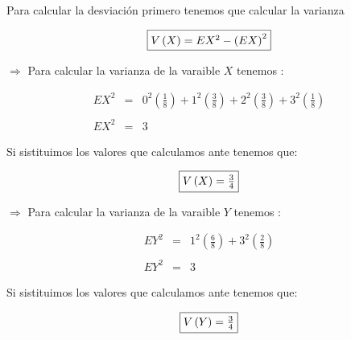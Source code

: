 \documentclass[12pt]{article}
\begin{document}
\begin{flushleft}
    Para calcular la desviaci\'on primero tenemos que calcular la varianza
\end{flushleft}

\begin{equation*}
    \fbox{$V\left(X\right) = EX^2 - \left(EX\right)^2
        $}
\end{equation*}

\begin{flushleft}
    $\Rightarrow$ Para calcular la varianza de la varaible $X$ tenemos :
\end{flushleft}

\begin{equation*}
    \begin{array}{rcl}
        EX^2 & = & \displaystyle 0^2 \left(\frac{1}{8}\right) + 1^2 \left(\frac{3}{8}\right) + 2^2 \left(\frac{3}{8}\right) + 3^2 \left(\frac{1}{8}\right)
        \\
        \\
        EX^2 & = & 3
    \end{array}
\end{equation*}

\begin{flushleft}
    Si sistituimos los valores que calculamos ante tenemos que:
\end{flushleft}

\begin{equation*}
    \fbox{$V\left(X\right) = \frac{3}{4}$}
\end{equation*}

\begin{flushleft}
    $\Rightarrow$ Para calcular la varianza de la varaible $Y$ tenemos :
\end{flushleft}

\begin{equation*}
    \begin{array}{rcl}
        EY^2 & = & \displaystyle 1^2 \left(\frac{6}{8}\right) + 3^2 \left(\frac{2}{8}\right)
        \\
        \\
        EY^2 & = & 3
    \end{array}
\end{equation*}

\begin{flushleft}
    Si sistituimos los valores que calculamos ante tenemos que:
\end{flushleft}

\begin{equation*}
    \fbox{$V\left(Y\right) = \frac{3}{4}$}
\end{equation*}
\end{document}
